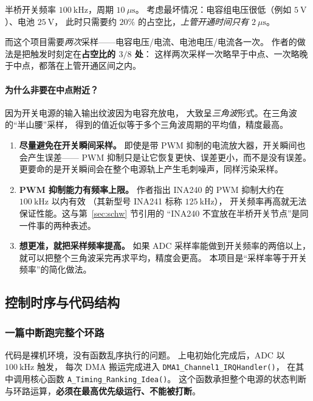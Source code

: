 \documentclass[cn,blue,11pt,device=normal]{elegantnote}
\begin{document}
半桥开关频率 $100\ \mathrm{kHz}$，周期 $10\ \mu\mathrm{s}$。
考虑最坏情况：电容组电压很低（例如 $5\ \mathrm{V}$）、电池 $25\ \mathrm{V}$，
此时只需要约 $20\%$ 的占空比，\emph{上管开通时间只有 $2\ \mu\mathrm{s}$}。

而这个项目需要\emph{两次}采样——电容电压/电流、电池电压/电流各一次。
作者的做法是把触发时刻定在\textbf{占空比的 $3/8$ 处}：
这样两次采样一次略早于中点、一次略晚于中点，都落在上管开通区间之内。

\paragraph{为什么非要在中点附近？}
因为开关电源的输入输出纹波因为电容充放电，
大致呈\emph{三角波}形式。在三角波的“半山腰”采样，
得到的值近似等于多个三角波周期的平均值，精度最高。

\begin{note}[三条采样经验]
\begin{enumerate}
  \item \textbf{尽量避免在开关瞬间采样。}
  即使是带 PWM 抑制的电流放大器，开关瞬间也会产生误差——
  PWM 抑制只是让它恢复更快、误差更小，而不是没有误差。
  更要命的是开关瞬间会在整个电源轨上产生毛刺噪声，同样污染采样。
  \item \textbf{PWM 抑制能力有频率上限。}
  作者指出 INA240 的 PWM 抑制大约在 $100\ \mathrm{kHz}$ 以内有效
  （其新型号 INA241 标称 $125\ \mathrm{kHz}$），
  开关频率再高就无法保证性能。这与第~\ref{sec:schw} 节引用的
  “INA240 不宜放在半桥开关节点”是同一件事的两种表述。
  \item \textbf{想更准，就把采样频率提高。}
  如果 ADC 采样率能做到开关频率的两倍以上，
  就可以把整个三角波采完再求平均，精度会更高。
  本项目是“采样率等于开关频率”的简化做法。
\end{enumerate}
\end{note}

\subsection{控制时序与代码结构}

\subsubsection{一篇中断跑完整个环路}

代码是裸机环境，没有函数乱序执行的问题。
上电初始化完成后，ADC 以 $100\ \mathrm{kHz}$ 触发，
每次 DMA 搬运完成进入 \texttt{DMA1\_\allowbreak{}Channel1\_\allowbreak{}IRQHandler()}，
在其中调用核心函数 \texttt{A\_\allowbreak{}Timing\_\allowbreak{}Ranking\_\allowbreak{}Idea()}。
这个函数承担整个电源的状态判断与环路运算，\textbf{必须在最高优先级运行、不能被打断}。
\end{document}
